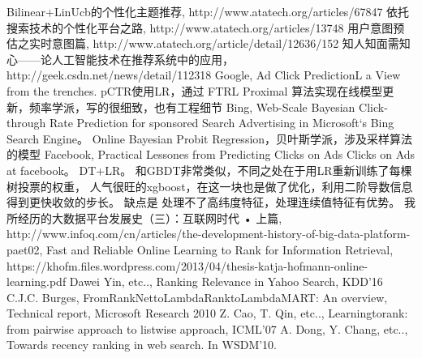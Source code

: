 \begin{thebibliography}{99}
 Bilinear+LinUcb的个性化主题推荐, http://www.atatech.org/articles/67847
 依托搜索技术的个性化平台之路, http://www.atatech.org/articles/13748
 用户意图预估之实时意图篇, http://www.atatech.org/article/detail/12636/152
 知人知面需知心——论人工智能技术在推荐系统中的应用，http://geek.csdn.net/news/detail/112318
 Google, Ad Click PredictionL a View from the trenches. pCTR使用LR，通过
FTRL Proximal 算法实现在线模型更新，频率学派，写的很细致，也有工程细节
 Bing, Web-Scale Bayesian Click-through Rate Prediction for sponsored 
Search Advertising in Microsoft‘s Bing Search Engine。 Online Bayesian Probit Regression，贝叶斯学派，涉及采样算法的模型
 Facebook, Practical Lessones from Predicting Clicks on Ads Clicks 
on Ads at facebook。 DT+LR。 和GBDT非常类似，不同之处在于用LR重新训练了每棵树投票的权重，
人气很旺的xgboost，在这一块也是做了优化，利用二阶导数信息得到更快收敛的步长。 缺点是
处理不了高纬度特征，处理连续值特征有优势。
 我所经历的大数据平台发展史（三）：互联网时代 • 上篇, http://www.infoq.com/cn/articles/the-development-history-of-big-data-platform-paet02, 
 Fast and Reliable Online Learning to Rank
for Information Retrieval, https://khofm.files.wordpress.com/2013/04/thesis-katja-hofmann-online-learning.pdf
 Dawei Yin, etc.., Ranking Relevance in Yahoo Search, KDD'16 
 C.J.C. Burges, FromRankNettoLambdaRanktoLambdaMART: An overview, Technical 
report, Microsoft Research 2010
 Z. Cao, T. Qin, etc.., Learningtorank: from pairwise approach to listwise approach, ICML'07 
 A. Dong, Y. Chang, etc.., Towards recency ranking in web search. In WSDM'10. 


\end{thebibliography}

 
